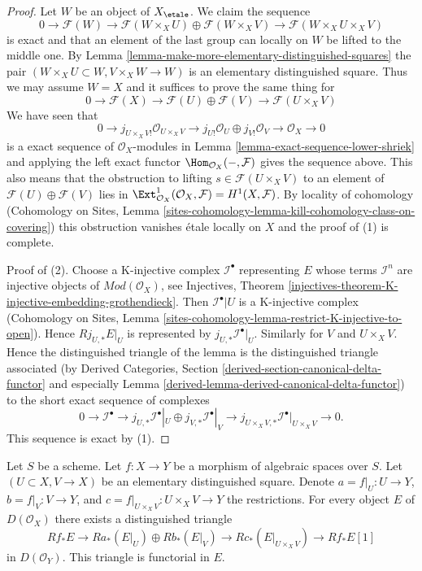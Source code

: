 \begin{proof}
Let $W$ be an object of $X_\etale$. We claim the sequence
$$
0 \to
\mathcal{F}(W) \to
\mathcal{F}(W \times_X U) \oplus \mathcal{F}(W \times_X V) \to
\mathcal{F}(W \times_X U \times_X V)
$$
is exact and that an element of the last group can locally on $W$
be lifted to the middle one.
By Lemma \ref{lemma-make-more-elementary-distinguished-squares}
the pair $(W \times_X U \subset W, V \times_X W \to W)$ is an elementary
distinguished square. Thus we may assume $W = X$ and it suffices
to prove the same thing for
$$
0 \to
\mathcal{F}(X) \to
\mathcal{F}(U) \oplus \mathcal{F}(V) \to
\mathcal{F}(U \times_X V)
$$
We have seen that
$$
0 \to j_{U \times_X V!}\mathcal{O}_{U \times_X V}
\to j_{U!}\mathcal{O}_U \oplus
j_{V!}\mathcal{O}_V \to
\mathcal{O}_X \to 0
$$
is a exact sequence of $\mathcal{O}_X$-modules in
Lemma \ref{lemma-exact-sequence-lower-shriek} and applying
the left exact functor $\Hom_{\mathcal{O}_X}(- , \mathcal{F})$
gives the sequence above. This also means that the obstruction
to lifting $s \in \mathcal{F}(U \times_X V)$ to
an element of $\mathcal{F}(U) \oplus \mathcal{F}(V)$ lies in
$\Ext^1_{\mathcal{O}_X}(\mathcal{O}_X, \mathcal{F}) =
H^1(X, \mathcal{F})$. By locality of cohomology
(Cohomology on Sites, Lemma
\ref{sites-cohomology-lemma-kill-cohomology-class-on-covering})
this obstruction vanishes \'etale locally on $X$ and the proof
of (1) is complete.

\medskip\noindent
Proof of (2).
Choose a K-injective complex $\mathcal{I}^\bullet$ representing $E$
whose terms $\mathcal{I}^n$ are injective objects of
$\textit{Mod}(\mathcal{O}_X)$, see Injectives, Theorem
\ref{injectives-theorem-K-injective-embedding-grothendieck}.
Then $\mathcal{I}^\bullet|U$ is a K-injective complex
(Cohomology on Sites, Lemma
\ref{sites-cohomology-lemma-restrict-K-injective-to-open}).
Hence $Rj_{U, *}E|_U$ is represented by $j_{U, *}\mathcal{I}^\bullet|_U$.
Similarly for $V$ and $U \times_X V$. Hence the distinguished triangle
of the lemma is the distinguished triangle associated (by
Derived Categories, Section
\ref{derived-section-canonical-delta-functor} and especially
Lemma \ref{derived-lemma-derived-canonical-delta-functor})
to the short exact sequence of complexes
$$
0 \to
\mathcal{I}^\bullet \to
j_{U, *}\mathcal{I}^\bullet|_U \oplus j_{V, *}\mathcal{I}^\bullet|_V \to
j_{U \times_X V, *}\mathcal{I}^\bullet|_{U \times_X V} \to
0.
$$
This sequence is exact by (1).
\end{proof}

\begin{lemma}
\label{lemma-unbounded-relative-mayer-vietoris}
Let $S$ be a scheme. Let $f : X \to Y$ be a morphism of algebraic spaces
over $S$. Let $(U \subset X, V \to X)$ be an elementary distinguished square.
Denote $a = f|_U : U \to Y$, $b = f|_V : V \to Y$, and
$c = f|_{U \times_X V} : U \times_X V \to Y$ the restrictions.
For every object $E$ of $D(\mathcal{O}_X)$ there exists a
distinguished triangle
$$
Rf_*E \to
Ra_*(E|_U) \oplus Rb_*(E|_V) \to
Rc_*(E|_{U \times_X V}) \to
Rf_*E[1]
$$
in $D(\mathcal{O}_Y)$. This triangle is functorial in $E$.
\end{lemma}


